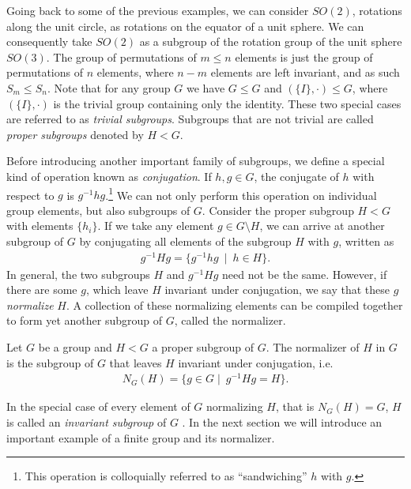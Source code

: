Going back to some of the previous examples, we can consider $SO(2)$, rotations
along the unit circle, as rotations on the equator of a unit sphere. We can
consequently take $SO(2)$ as a subgroup of the rotation group of the unit
sphere $SO(3)$. The group of permutations of $m \leq n$ elements is just the
group of permutations of $n$ elements, where $n-m$ elements are left invariant,
and as such $S_m \leq S_n$. Note that for any group $G$ we have $G \leq G$ and
$(\{I\}, \cdot) \leq G$, where $\left( \{I\}, \cdot \right)$ is the trivial
group containing only the identity. These two special cases are referred to as
\emph{trivial subgroups}. Subgroups that are not trivial are called
\emph{proper subgroups} denoted by $H<G$.

Before introducing another important family of subgroups, we define a special
kind of operation known as \emph{conjugation}. If $h,g\in G$, the conjugate of
$h$ with respect to $g$ is $g^{-1} h g$.\footnote{This operation is
colloquially referred to as \enquote{sandwiching} $h$ with $g$.}
We can not only perform this operation on individual group elements, but also
subgroups of $G$. 
Consider the proper subgroup $H<G$ with elements $\{h_i\}$. 
If we take any element $g \in G
\setminus H$, we can arrive at another subgroup of $G$ by conjugating all
elements of the
subgroup $H$ with $g$, written as
\begin{align}
  g^{-1}Hg = \{ g^{-1} h g \ \mid \ h \in H \}
.\end{align}
In general, the two subgroups $H$ and $g^{-1}Hg$ need not be the same. However,
if there are some $g$, which leave $H$ invariant under conjugation, we say that
these $g$ \emph{normalize} $H$. A collection of these normalizing elements can
be compiled together to form yet another subgroup of $G$, called the
normalizer.
\begin{defn}\label{defn:normalizer}
  Let $G$ be a group and $H < G$ a proper subgroup of $G$. The normalizer of
  $H$ in $G$ is the subgroup of $G$ that leaves $H$ invariant under
  conjugation, i.e.
  \begin{align}
    N_G(H) = \{ g \in G \mid \ g^{-1} H g = H \}
  .\end{align}
\end{defn}
In the special case of every element of $G$ normalizing $H$, that is $N_G(H) =
G$, $H$ is called an \emph{invariant subgroup} of $G$
\cite{zeeGroupTheoryNutshell2016}. In the next section we
will introduce an important example of a finite group and its normalizer. 

